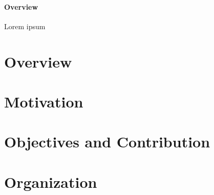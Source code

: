 \paragraph{Overview} Lorem ipsum
\section{\label{section:Overview}Overview}
\section{\label{section:Motivation}Motivation}
\section{\label{section:Objectives}Objectives and Contribution}
\section{\label{section:Organization}Organization}
